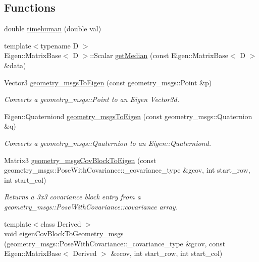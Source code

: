 \subsection*{Functions}
\begin{DoxyCompactItemize}
\item 
double \hyperlink{namespacemsf__core_aee980177ac4429201472c20bb8b04612}{timehuman} (double val)
\item 
{\footnotesize template$<$typename D $>$ }\\Eigen\-::\-Matrix\-Base$<$ D $>$\-::Scalar \hyperlink{namespacemsf__core_aa8485fa93cf8a65a20cf609a6ec40f56}{get\-Median} (const Eigen\-::\-Matrix\-Base$<$ D $>$ \&data)
\item 
Vector3 \hyperlink{namespacemsf__core_a531123cfe2ad9131a453087bc974e6dd}{geometry\-\_\-msgs\-To\-Eigen} (const geometry\-\_\-msgs\-::\-Point \&p)
\begin{DoxyCompactList}\small\item\em Converts a geometry\-\_\-msgs\-::\-Point to an Eigen Vector3d. \end{DoxyCompactList}\item 
Eigen\-::\-Quaterniond \hyperlink{namespacemsf__core_a3430943bc018ba721de751a9fcdb8462}{geometry\-\_\-msgs\-To\-Eigen} (const geometry\-\_\-msgs\-::\-Quaternion \&q)
\begin{DoxyCompactList}\small\item\em Converts a geometry\-\_\-msgs\-::\-Quaternion to an Eigen\-::\-Quaterniond. \end{DoxyCompactList}\item 
Matrix3 \hyperlink{namespacemsf__core_a3b1572f4facb6f46c2b154cb1fd7372c}{geometry\-\_\-msgs\-Cov\-Block\-To\-Eigen} (const geometry\-\_\-msgs\-::\-Pose\-With\-Covariance\-::\-\_\-covariance\-\_\-type \&gcov, int start\-\_\-row, int start\-\_\-col)
\begin{DoxyCompactList}\small\item\em Returns a 3x3 covariance block entry from a geometry\-\_\-msgs\-::\-Pose\-With\-Covariance\-::covariance array. \end{DoxyCompactList}\item 
{\footnotesize template$<$class Derived $>$ }\\void \hyperlink{namespacemsf__core_aa55165dedfc79ffa6f95b337d2e8b1eb}{eigen\-Cov\-Block\-To\-Geometry\-\_\-msgs} (geometry\-\_\-msgs\-::\-Pose\-With\-Covariance\-::\-\_\-covariance\-\_\-type \&gcov, const Eigen\-::\-Matrix\-Base$<$ Derived $>$ \&ecov, int start\-\_\-row, int start\-\_\-col)

\end{DoxyCompactItemize}
